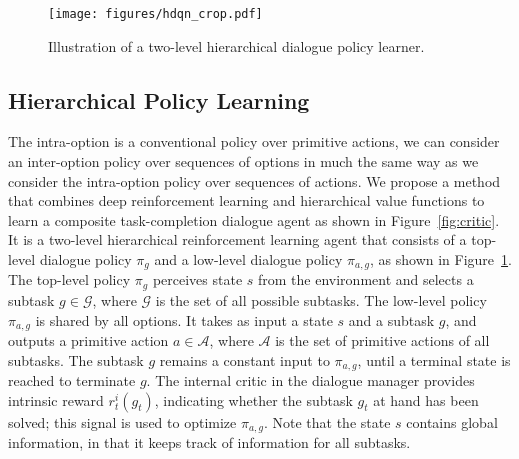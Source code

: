 \documentclass[11pt,letterpaper]{article}
\begin{document}
\begin{figure}[htb]
\centering
\texttt{[image: figures/hdqn\_crop.pdf]}
\vspace{-9mm}
\caption{Illustration of a two-level hierarchical dialogue policy learner.}
\label{fig:hdqn}
\end{figure}

\subsection{Hierarchical Policy Learning}
The intra-option is a conventional policy over primitive actions, we can consider an inter-option policy over sequences of options in much the same way as we consider the intra-option policy over sequences of actions. 
We propose a method that combines deep reinforcement learning and hierarchical value functions to learn a composite task-completion dialogue agent as shown in Figure~\ref{fig:critic}.
It is a two-level hierarchical reinforcement learning agent that consists of a top-level dialogue policy $\pi_g$ and a low-level dialogue policy $\pi_{a,g}$, as shown in Figure~\ref{fig:hdqn}. The top-level policy $\pi_g$ perceives state $s$ from the environment and selects a subtask $g \in \mathcal{G}$, where $\mathcal{G}$ is the set of all possible subtasks.  The low-level policy $\pi_{a,g}$ is shared by all options.  It takes as input a state $s$ and a subtask $g$, and outputs a primitive action $a \in \mathcal{A}$, where $\mathcal{A}$ is the set of primitive actions of all subtasks. 
The subtask $g$ remains a constant input to $\pi_{a,g}$, until a terminal state is reached to terminate $g$. The internal critic in the dialogue manager provides intrinsic reward $r^i_t(g_t)$, indicating whether the subtask $g_t$ at hand has been solved; this signal is used to optimize $\pi_{a,g}$.
Note that the state $s$ contains global information, in that it keeps track of information for all subtasks. %
\end{document}
